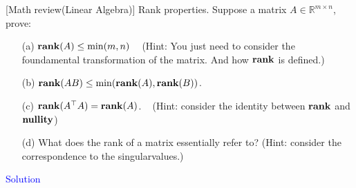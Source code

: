 \item {} [Math review(Linear Algebra)] Rank properties. Suppose a matrix $A\in \mathbb{R}^{m\times n}$, prove:
\begin{itemize}
    \item[(a)] $\mathop{\bf rank}(A)\leq \min(m, n)$ ~ (Hint: You just need to consider the foundamental transformation of the matrix. And how $\mathop{\bf rank}$ is defined.)
    \item[(b)] $\mathop{\bf rank}(AB)\leq \min(\mathop{\bf rank}(A),\mathop{\bf rank}(B))$. ~
    \item[(c)] $\mathop{\bf rank}(A^{\top}A)=\mathop{\bf rank}(A)$. ~ (Hint: consider the identity between $\mathop{\bf rank}$ and $\textbf{nullity}$)
    \item[(d)] What does the rank of a matrix essentially refer to? (Hint: consider the correspondence to the singularvalues.) ~
\end{itemize}

\textcolor{blue}{Solution} \\







\newpage